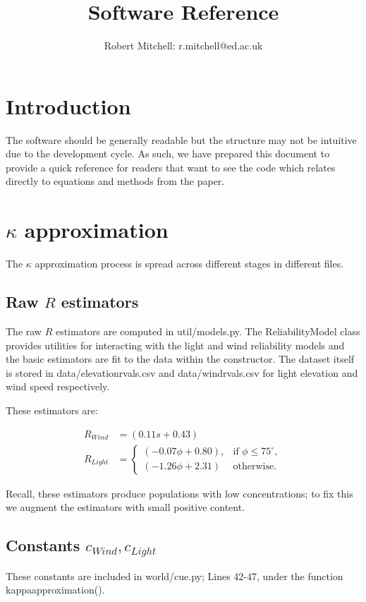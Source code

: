 \documentclass[10pt, a4paper]{article}
\begin{document}
\title{Software Reference}
\author{Robert Mitchell: r.mitchell@ed.ac.uk}
\maketitle
\section{Introduction}
The software should be generally readable but the structure may not be
intuitive due to the development cycle. As such, we have prepared this
document to provide a quick reference for readers that want to see the
code which relates directly to equations and methods from the
paper.

\section{$\kappa$ approximation}
The $\kappa$ approximation process is spread across different stages
in different files.

\subsection{Raw $R$ estimators}
The raw $R$ estimators are computed in util/models.py. The
ReliabilityModel class provides utilities for interacting with the
light and wind reliability models and the basic estimators are fit to
the data within the constructor. The dataset itself is stored in
data/elevation\textunderscore rvals.csv and
data/wind\textunderscore rvals.csv for light elevation and wind speed
respectively.

These estimators are:

\begin{align}
  R_{Wind} &= (0.11s + 0.43)\\
  R_{Light} &=
  \begin{cases}
    (-0.07\phi + 0.80), &\text{if } \phi \leq 75^\circ,\\
    (-1.26\phi + 2.31) &\text{otherwise.}
  \end{cases}
\end{align}

Recall, these estimators produce populations with low concentrations;
to fix this we augment the estimators with small positive content.

\subsection{Constants $c_{Wind}, c_{Light}$}
These constants are included in world/cue.py; Lines 42-47, under the function
\textunderscore\textunderscore kappa\textunderscore approximation().
\end{document}
